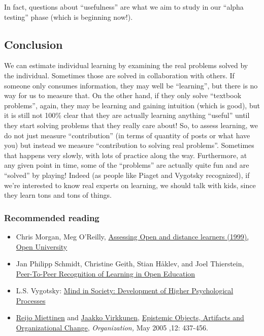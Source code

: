 In fact, questions about ``usefulness'' are what we aim to study in our
``alpha testing'' phase (which is beginning now!).

\subsection{Conclusion}

We can estimate individual learning by examining the real problems
solved by the individual. Sometimes those are solved in collaboration
with others. If someone only consumes information, they may well be
``learning'', but there is no way for us to measure that. On the other
hand, if they only solve ``textbook problems'', again, they may be
learning and gaining intuition (which is good), but it is still not
100\% clear that they are actually learning anything ``useful'' until
they start solving problems that they really care about! So, to assess
learning, we do not just measure ``contribution'' (in terms of quantity
of posts or what have you) but instead we measure ``contribution to
solving real problems''. Sometimes that happens very slowly, with lots
of practice along the way. Furthermore, at any given point in time, some
of the ``problems'' are actually quite fun and are ``solved'' by
playing! Indeed (as people like Piaget and Vygotsky recognized), if
we're interested to know real experts on learning, we should talk with
kids, since they learn tons and tons of things.

\subsubsection{Recommended reading}

\begin{itemize}
\item
  Chris Morgan, Meg O'Reilly,
  \href{http://books.google.com/books/about/Assessing\_Open\_and\_Distance\_Learners.html?id=wZcihyWRdIIC}{Assessing
  Open and distance learners (1999), Open University}
\item
  Jan Philipp Schmidt, Christine Geith, Stian Håklev, and Joel
  Thierstein,
  \href{http://www.irrodl.org/index.php/irrodl/article/view/641/1389}{Peer-To-Peer
  Recognition of Learning in Open Education}
\item
  L.S. Vygotsky:
  \href{http://books.google.com/books?id=RxjjUefze\_oC\&printsec=frontcover\&source=gbs\_atb\#v=onepage\&q\&f=false}{Mind
  in Society: Development of Higher Psychological Processes}
\item
  \href{http://org.sagepub.com/search?author1=Reijo+Miettinen\&sortspec=date\&submit=Submit}{Reijo
  Miettinen} and
  \href{http://org.sagepub.com/search?author1=Jaakko+Virkkunen\&sortspec=date\&submit=Submit}{Jaakko
  Virkkunen},
  \href{http://org.sagepub.com/content/12/3/437.abstract}{Epistemic
  Objects, Artifacts and Organizational Change}, \emph{Organization,}
  May 2005 ,12: 437-456.
\end{itemize}

